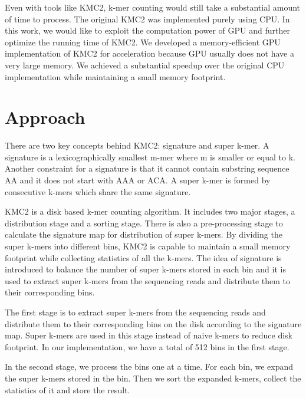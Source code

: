 \documentclass{bioinfo}
\begin{document}
Even with tools like KMC2, k-mer counting would still take a substantial amount of time to
process. The original KMC2 was implemented purely using CPU.
In this work, we would like to exploit the computation power of GPU and further optimize
the running time of KMC2. We developed a memory-efficient GPU implementation of KMC2 for
acceleration because GPU usually does not have a very large memory.
We achieved a substantial speedup over the original CPU implementation while maintaining a
small memory footprint.

\section{Approach}
There are two key concepts behind KMC2: signature and super k-mer.
A signature is a lexicographically smallest m-mer where m is smaller or equal to k.
Another constraint for a signature is that it cannot contain substring sequence AA and it
does not start with AAA or ACA.
A super k-mer is formed by consecutive k-mers which share the same signature.

KMC2 is a disk based k-mer counting algorithm. It includes two major stages, a
distribution stage and a sorting stage. There is also a pre-processing stage to calculate
the signature map for distribution of super k-mers. By dividing the super k-mers into
different bins, KMC2 is capable to maintain a small memory footprint while collecting
statistics of all the k-mers.
The idea of signature is introduced to balance the number of super k-mers stored in each
bin and it is used to extract super k-mers from the sequencing reads and distribute them
to their corresponding bins.

The first stage is to extract super k-mers from the sequencing reads and distribute them
to their corresponding bins on the disk according to the signature map.
Super k-mers are used in this stage instead of naive k-mers to reduce disk footprint.
In our implementation, we have a total of 512 bins in the first stage.

In the second stage, we process the bins one at a time. For each bin, we expand the super
k-mers stored in the bin. Then we sort the expanded k-mers, collect the statistics of it
and store the result.
\end{document}
